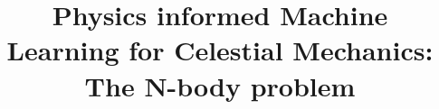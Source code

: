 \documentclass[draft]{agujournal2019}
\begin{document}
%
%


\title{Physics informed Machine Learning for Celestial Mechanics: The N-body problem}

%
%











\end{document}
